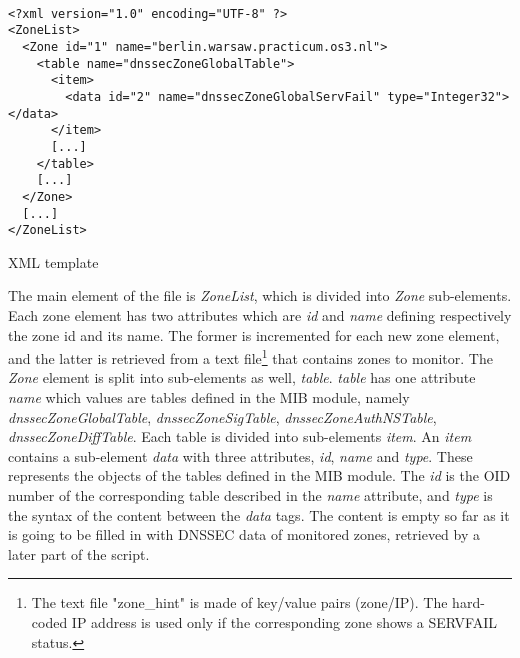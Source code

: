 \begin{listing}
\begin{verbatim}

<?xml version="1.0" encoding="UTF-8" ?>
<ZoneList>
  <Zone id="1" name="berlin.warsaw.practicum.os3.nl">
    <table name="dnssecZoneGlobalTable">
      <item>
        <data id="2" name="dnssecZoneGlobalServFail" type="Integer32"> </data>
      </item>
      [...]
    </table>
    [...]
  </Zone>
  [...]
</ZoneList>
\end{verbatim}
\caption{XML template}
\label{listing:xml}
\end{listing}
The main element of the file is \textit{ZoneList}, which is divided into \textit{Zone} sub-elements. Each zone element has two attributes which are \textit{id} and \textit{name} defining respectively the zone id and its name. The former is incremented for each new zone element, and the latter is retrieved from a text file\footnote{The text file "zone\_hint" is made of key/value pairs (zone/IP). The hard-coded IP address is used only if the corresponding zone shows a SERVFAIL status.} that contains zones to monitor. The \textit{Zone} element is split into sub-elements as well, \textit{table}. \textit{table} has one attribute \textit{name} which values are tables defined in the MIB module, namely \textit{dnssecZoneGlobalTable}, \textit{dnssecZoneSigTable}, \textit{dnssecZoneAuthNSTable}, \textit{dnssecZoneDiffTable}. Each table is divided into sub-elements \textit{item}. An \textit{item} contains a sub-element \textit{data} with three attributes, \textit{id}, \textit{name} and \textit{type}. These represents the objects of the tables defined in the MIB module. The \textit{id} is the OID number of the corresponding table described in the \textit{name} attribute, and \textit{type} is the syntax of the content between the \textit{data} tags. The content is empty so far as it is going to be filled in with DNSSEC data of monitored zones, retrieved by a later part of the script.

